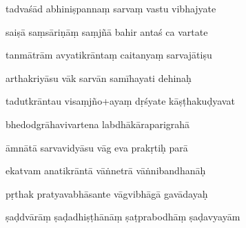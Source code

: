 \documentclass[article,12pt,a4paper]{memoir}%
\newcounter{parCount}
\begin{document}
	  
	  \pstart \leavevmode%
	tadvaśād abhiniṣpannaṃ sarvaṃ vastu vibhajyate 
	{}
	\pend%
      

	  
	  \pstart {} saiṣā saṃsāriṇāṃ saṃjñā bahir antaś ca vartate 
	{}
	\pend%
      

	  
	  \pstart \leavevmode%
	tanmātrām avyatikrāntaṃ caitanyaṃ sarvajātiṣu 
	{}
	\pend%
      

	  
	  \pstart {} arthakriyāsu vāk sarvān samīhayati dehinaḥ 
	{}
	\pend%
      

	  
	  \pstart \leavevmode%
	tadutkrāntau visaṃjño+ayaṃ dṛśyate kāṣṭhakuḍyavat 
	{}
	\pend%
      

	  
	  \pstart {} bhedodgrāhavivartena labdhākāraparigrahā 
	{}
	\pend%
      

	  
	  \pstart \leavevmode%
	āmnātā sarvavidyāsu vāg eva prakṛtiḥ parā 
	{}
	\pend%
      

	  
	  \pstart {} ekatvam anatikrāntā vāṅnetrā vāṅnibandhanāḥ 
	{}
	\pend%
      

	  
	  \pstart \leavevmode%
	pṛthak pratyavabhāsante vāgvibhāgā gavādayaḥ 
	{}
	\pend%
      

	  
	  \pstart {} ṣaḍdvārāṃ ṣaḍadhiṣṭhānāṃ ṣaṭprabodhāṃ ṣaḍavyayām 
	{}
	\pend%
      
\end{document}
